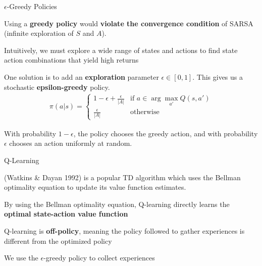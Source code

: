 \begin{frame}{$\epsilon$-Greedy Policies}

    Using a \textbf{greedy policy} would \textbf{violate the convergence condition} of SARSA (infinite exploration of $S$ and $A$). 
    \vspace{0pt}
    \blist
        \item Intuitively, we must explore a wide range of states and actions to find state action combinations that yield high returns
        \item One solution is to add an \textbf{exploration} parameter $\epsilon \in [0, 1]$. This gives us a stochastic \textbf{epsilon-greedy} policy.
    \elist
    \vspace{0pt}
    \begin{align*}
        \pi(a|s) = \begin{cases} 
        1 - \epsilon + \frac{\epsilon}{|A|} & \text{if } a \in \arg\max_{a'} Q(s, a') \\
        \frac{\epsilon}{|A|} & \text{otherwise} 
    \end{cases}
    \end{align*}

    \blist
        \item With probability $1-\epsilon$, the policy chooses the greedy action, and with probability $\epsilon$ chooses an action uniformly at random. 
    \elist
    
\end{frame}

\begin{frame}{Q-Learning}

     (Watkins \& Dayan 1992) is a popular TD algorithm which uses the Bellman optimality equation to update its value function estimates.
    \vspace{10pt}
    \blist
        \item By using the Bellman optimality equation, Q-learning directly learns the \textbf{optimal state-action value function}
        \item Q-learning is \textbf{off-policy}, meaning the policy followed to gather experiences is different from the optimized policy
        \item We use the $\epsilon$-greedy policy to collect experiences
    \elist

\end{frame}

